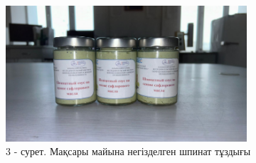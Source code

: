 \begin{figure}[H]
	\centering
	\includegraphics[width=0.8\textwidth]{media/pish3/image3}
	\caption*{3 - сурет. Мақсары майына негізделген шпинат тұздығы}
\end{figure}

